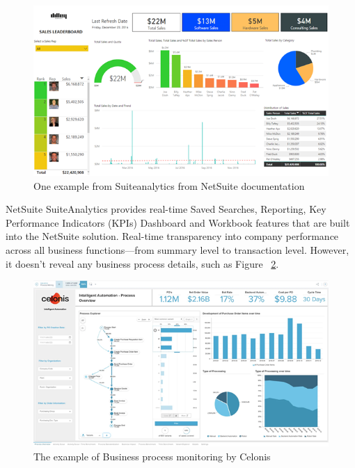 \begin{figure}[!htb]
    \centering 
    \includegraphics[scale=0.7]{resource/Suiteanalytics.png}
    \caption{One example from Suiteanalytics from NetSuite documentation}
    \label{figure:suiteAnalytics}
\end{figure}


NetSuite SuiteAnalytics provides real-time Saved Searches, Reporting, Key Performance Indicators (KPIs) Dashboard and Workbook features that are built into the NetSuite solution. Real-time transparency into company performance across all business functions—from summary level to transaction level. However, it doesn't reveal any business process details, such as Figure ~\ref{figure:monitor}.


\begin{figure}[!htb]
    \centering 
    \includegraphics[scale=0.7]{resource/monitor.png}
    \caption{The example of Business process monitoring by Celonis}
    \label{figure:monitor}
\end{figure}








